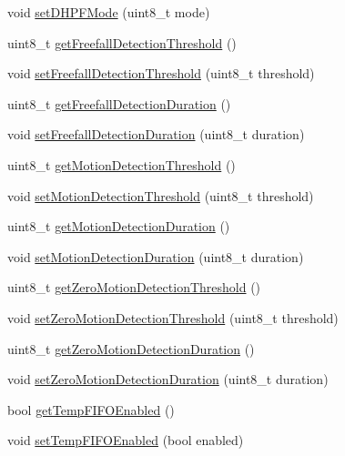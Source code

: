 \begin{DoxyCompactItemize}
\item 
void \mbox{\hyperlink{class_m_p_u6050_a44cc43aaad1e52c1ba3142d4490af611}{set\+D\+H\+P\+F\+Mode}} (uint8\+\_\+t mode)
\item 
uint8\+\_\+t \mbox{\hyperlink{class_m_p_u6050_ac7f5c0511fe9d0f3525a3757498daed7}{get\+Freefall\+Detection\+Threshold}} ()
\item 
void \mbox{\hyperlink{class_m_p_u6050_af704e1a4eb01522b146abeba78c32716}{set\+Freefall\+Detection\+Threshold}} (uint8\+\_\+t threshold)
\item 
uint8\+\_\+t \mbox{\hyperlink{class_m_p_u6050_a3cff6b9613ad01aa1a51c287f5c5e329}{get\+Freefall\+Detection\+Duration}} ()
\item 
void \mbox{\hyperlink{class_m_p_u6050_a41eeb40a654465966d260e3d31c4de4b}{set\+Freefall\+Detection\+Duration}} (uint8\+\_\+t duration)
\item 
uint8\+\_\+t \mbox{\hyperlink{class_m_p_u6050_ab7a825b1b8b86cebda308289630795e7}{get\+Motion\+Detection\+Threshold}} ()
\item 
void \mbox{\hyperlink{class_m_p_u6050_aa23c8d66502345c30915e69975fd2cc9}{set\+Motion\+Detection\+Threshold}} (uint8\+\_\+t threshold)
\item 
uint8\+\_\+t \mbox{\hyperlink{class_m_p_u6050_a8ba035c2ae4a05d7e51b0d29e4924fb0}{get\+Motion\+Detection\+Duration}} ()
\item 
void \mbox{\hyperlink{class_m_p_u6050_a6d81616aaa47539217057891c91ff08f}{set\+Motion\+Detection\+Duration}} (uint8\+\_\+t duration)
\item 
uint8\+\_\+t \mbox{\hyperlink{class_m_p_u6050_ad941c1e844dc9230675c115734599ea3}{get\+Zero\+Motion\+Detection\+Threshold}} ()
\item 
void \mbox{\hyperlink{class_m_p_u6050_a347a51fd25de20b9ead4659015ef793b}{set\+Zero\+Motion\+Detection\+Threshold}} (uint8\+\_\+t threshold)
\item 
uint8\+\_\+t \mbox{\hyperlink{class_m_p_u6050_a04c0fcdcd0157b6dbf74d4901424801e}{get\+Zero\+Motion\+Detection\+Duration}} ()
\item 
void \mbox{\hyperlink{class_m_p_u6050_a6d25a21e1673682f096399b719c66d2c}{set\+Zero\+Motion\+Detection\+Duration}} (uint8\+\_\+t duration)
\item 
bool \mbox{\hyperlink{class_m_p_u6050_a913c2095001e204b5b09f8382a86d2ca}{get\+Temp\+F\+I\+F\+O\+Enabled}} ()
\item 
void \mbox{\hyperlink{class_m_p_u6050_ae528a25b4997ad0e3091a012e4e4419e}{set\+Temp\+F\+I\+F\+O\+Enabled}} (bool enabled)
\item 

\end{DoxyCompactItemize}
